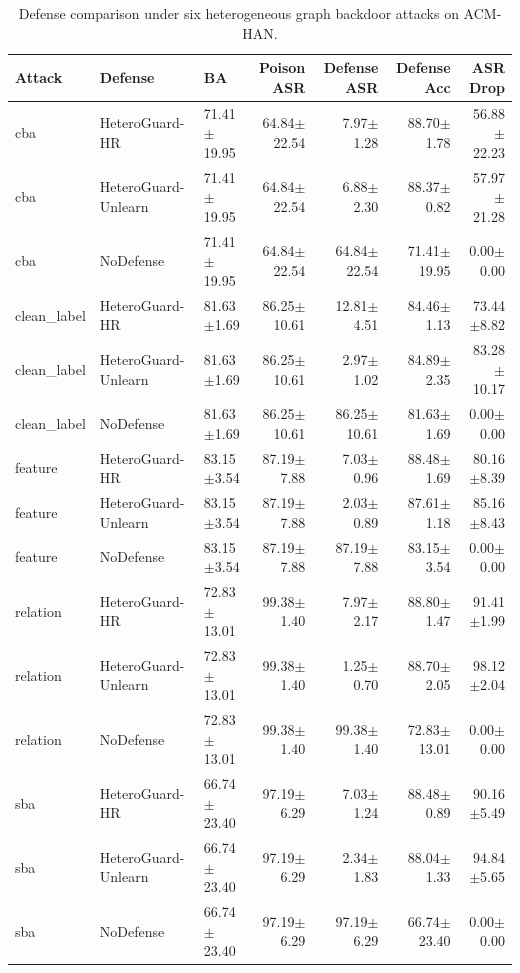 \begin{table}[t]
\centering
\caption{Defense comparison under six heterogeneous graph backdoor attacks on ACM-HAN.}
\label{tab:defense_suite_acm_han}
\begin{tabular}{lllrrrr}
\toprule
Attack & Defense & BA & Poison ASR & Defense ASR & Defense Acc & ASR Drop \\
\midrule
cba & HeteroGuard-HR & 71.41$\pm$19.95 & 64.84$\pm$22.54 & 7.97$\pm$1.28 & 88.70$\pm$1.78 & 56.88$\pm$22.23 \\
cba & HeteroGuard-Unlearn & 71.41$\pm$19.95 & 64.84$\pm$22.54 & 6.88$\pm$2.30 & 88.37$\pm$0.82 & 57.97$\pm$21.28 \\
cba & NoDefense & 71.41$\pm$19.95 & 64.84$\pm$22.54 & 64.84$\pm$22.54 & 71.41$\pm$19.95 & 0.00$\pm$0.00 \\
clean_label & HeteroGuard-HR & 81.63$\pm$1.69 & 86.25$\pm$10.61 & 12.81$\pm$4.51 & 84.46$\pm$1.13 & 73.44$\pm$8.82 \\
clean_label & HeteroGuard-Unlearn & 81.63$\pm$1.69 & 86.25$\pm$10.61 & 2.97$\pm$1.02 & 84.89$\pm$2.35 & 83.28$\pm$10.17 \\
clean_label & NoDefense & 81.63$\pm$1.69 & 86.25$\pm$10.61 & 86.25$\pm$10.61 & 81.63$\pm$1.69 & 0.00$\pm$0.00 \\
feature & HeteroGuard-HR & 83.15$\pm$3.54 & 87.19$\pm$7.88 & 7.03$\pm$0.96 & 88.48$\pm$1.69 & 80.16$\pm$8.39 \\
feature & HeteroGuard-Unlearn & 83.15$\pm$3.54 & 87.19$\pm$7.88 & 2.03$\pm$0.89 & 87.61$\pm$1.18 & 85.16$\pm$8.43 \\
feature & NoDefense & 83.15$\pm$3.54 & 87.19$\pm$7.88 & 87.19$\pm$7.88 & 83.15$\pm$3.54 & 0.00$\pm$0.00 \\
relation & HeteroGuard-HR & 72.83$\pm$13.01 & 99.38$\pm$1.40 & 7.97$\pm$2.17 & 88.80$\pm$1.47 & 91.41$\pm$1.99 \\
relation & HeteroGuard-Unlearn & 72.83$\pm$13.01 & 99.38$\pm$1.40 & 1.25$\pm$0.70 & 88.70$\pm$2.05 & 98.12$\pm$2.04 \\
relation & NoDefense & 72.83$\pm$13.01 & 99.38$\pm$1.40 & 99.38$\pm$1.40 & 72.83$\pm$13.01 & 0.00$\pm$0.00 \\
sba & HeteroGuard-HR & 66.74$\pm$23.40 & 97.19$\pm$6.29 & 7.03$\pm$1.24 & 88.48$\pm$0.89 & 90.16$\pm$5.49 \\
sba & HeteroGuard-Unlearn & 66.74$\pm$23.40 & 97.19$\pm$6.29 & 2.34$\pm$1.83 & 88.04$\pm$1.33 & 94.84$\pm$5.65 \\
sba & NoDefense & 66.74$\pm$23.40 & 97.19$\pm$6.29 & 97.19$\pm$6.29 & 66.74$\pm$23.40 & 0.00$\pm$0.00 \\

\end{tabular}
\end{table}
